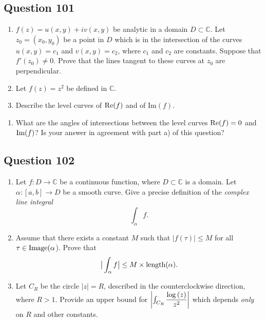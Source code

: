 \documentclass[12pt]{article}
\providecommand{\tightlist}{%
  \setlength{\itemsep}{0pt}\setlength{\parskip}{0pt}}
\begin{document}
\hypertarget{question-101-1}{%
\subsection{Question 101}\label{question-101-1}}

\begin{enumerate}
\def\labelenumi{(\alph{enumi})}
\item
  \(f(z)= u(x,y) +i v(x,y)\) be analytic in a domain
  \(D\subset {\mathbb C}\). Let \(z_0=(x_0,y_0)\) be a point in \(D\)
  which is in the intersection of the curves \(u(x,y)= c_1\) and
  \(v(x,y)=c_2\), where \(c_1\) and \(c_2\) are constants. Suppose that
  \(f'(z_0)\neq 0\). Prove that the lines tangent to these curves at
  \(z_0\) are perpendicular.
\item
  Let \(f(z)=z^2\) be defined in \({\mathbb C}\).
\item
  Describe the level curves of \(\mbox{\textrm Re}{(f)}\) and of
  \(\mbox{Im}{(f)}\).
\end{enumerate}

\begin{enumerate}
\def\labelenumi{(\roman{enumi})}
\setcounter{enumi}{1}
\tightlist
\item
  What are the angles of intersections between the level curves
  \(\mbox{\textrm Re}{(f)}=0\) and \(\mbox{\textrm Im}{(f)}\)? Is your
  answer in agreement with part a) of this question?
\end{enumerate}

\hypertarget{question-102-1}{%
\subsection{Question 102}\label{question-102-1}}

\begin{enumerate}
\def\labelenumi{(\alph{enumi})}
\item
  Let \(f: D\rightarrow \mathbb C\) be a continuous function, where
  \(D\subset \mathbb C\) is a domain. Let \(\alpha:[a,b]\rightarrow D\)
  be a smooth curve. Give a precise definition of the \emph{complex line
  integral} \[\int_{\alpha} f.\]
\item
  Assume that there exists a constant \(M\) such that
  \(|f(\tau)|\leq M\) for all \(\tau\in \mbox{\textrm Image}(\alpha\)).
  Prove that
  \[\big | \int_{\alpha} f \big |\leq M \times \mbox{\textrm length}(\alpha).\]
\item
  Let \(C_R\) be the circle \(|z|=R\), described in the counterclockwise
  direction, where \(R>1\). Provide an upper bound for
  \({\left\lvert { \int_{C_R} \dfrac{\log{(z)} }{z^2} } \right\rvert}\) which depends
  \emph{only} on \(R\) and other constants.
\end{enumerate}
\end{document}
